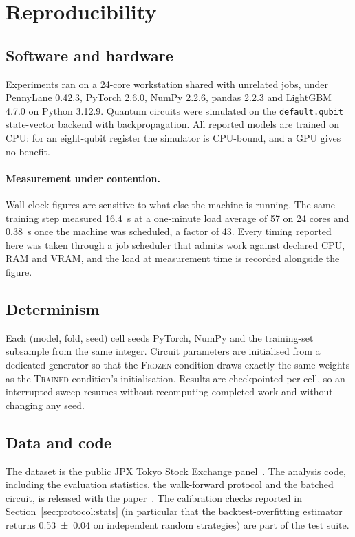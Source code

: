 \section{Reproducibility}
\label{sec:repro}

\subsection{Software and hardware}
Experiments ran on a 24-core workstation shared with unrelated jobs, under
PennyLane 0.42.3, PyTorch 2.6.0, NumPy 2.2.6, pandas 2.2.3 and LightGBM 4.7.0 on Python
3.12.9. Quantum circuits were simulated on the \texttt{default.qubit}
state-vector backend with backpropagation. All reported models are trained on
CPU: for an eight-qubit register the simulator is CPU-bound, and a GPU gives no
benefit.

\paragraph{Measurement under contention.}
Wall-clock figures are sensitive to what else the machine is running. The same
training step measured \SI{16.4}{\second} at a one-minute load average of 57 on
24 cores and \SI{0.38}{\second} once the machine was scheduled, a factor of 43.
Every timing reported here was taken through a job scheduler that admits work
against declared CPU, RAM and VRAM, and the load at measurement time is
recorded alongside the figure.

\subsection{Determinism}
Each (model, fold, seed) cell seeds PyTorch, NumPy and the training-set
subsample from the same integer. Circuit parameters are initialised from a
dedicated generator so that the \textsc{Frozen} condition draws exactly the same
weights as the \textsc{Trained} condition's initialisation. Results are
checkpointed per cell, so an interrupted sweep resumes without recomputing
completed work and without changing any seed.

\subsection{Data and code}
The dataset is the public JPX Tokyo Stock Exchange
panel~\citep{jpx2022competition}. The analysis code, including the evaluation
statistics, the walk-forward protocol and the batched circuit, is released with
the paper~\citep{chen2026repo}. The calibration checks reported in
Section~\ref{sec:protocol:stats} (in particular that the
backtest-overfitting estimator returns \num{0.53(4)} on independent random
strategies) are part of the test suite.

